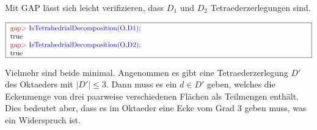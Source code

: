 \documentclass[12pt,titlepage,twoside,cleardoublepage]{article}
\theoremstyle{nummermitklammern}
\numberwithin{equation}{section}
\begin{document}
Mit GAP lässt sich leicht verifizieren, dass $D_1$ und $D_2$  Tetraederzerlegungen sind.
\begin{center}
$\fbox{
\parbox{15cm}{
\textcolor{red}{gap$>$}  \textcolor{blue}{IsTetrahedrialDecomposition(O,D1);}\newline
 true \newline
\textcolor{red}{gap$>$}  \textcolor{blue}{IsTetrahedrialDecomposition(O,D2);}\newline
 true
 }}$ 
 \end{center}
Vielmehr sind beide minimal. Angenommen es gibt eine Tetraederzerlegung $D'$ des Oktaeders mit $\vert D' \vert\leq 3$. Dann muss es ein $d\in D'$ geben, welches die Eckenmenge von drei paarweise verschiedenen Flächen als Teilmengen enthält. Dies bedeutet aber, dass es im Oktaeder eine Ecke vom Grad 3 geben muss, was ein Widerspruch ist. 
\end{document}
